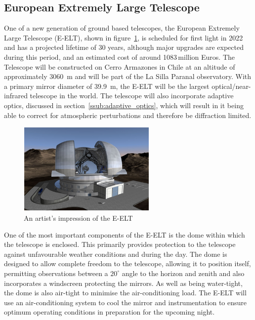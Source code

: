 
\subsection{European Extremely Large Telescope} %
\label{sub:european_extremely_large_telescope}
	One of a new generation of ground based telescopes, the European Extremely Large Telescope (E-ELT), shown in figure~\ref{fig:artist_eelt}, is scheduled for first light in 2022 and has a projected lifetime of 30 years, although major upgrades are expected during this period\cite[p.~163]{E_ELT_Construction_Proposal}, and an estimated cost of around 1083\,million Euros. The Telescope will be constructed on Cerro Armazones in Chile at an altitude of approximately \SI{3060}{\metre} and will be part of the La Silla Paranal observatory. With a primary mirror diameter of \SI{39.9}{\metre}, the E-ELT will be the largest optical/near-infrared telescope in the world. The telescope will also incorporate adaptive optics, discussed in section~\ref{ssub:adaptive_optics}, which will result in it being able to correct for atmospheric perturbations and therefore be diffraction limited.
	\begin{figure}[ht]
		\centering
		\includegraphics[width=0.6\textwidth]{../Images/E-ELT.png}
		\caption{An artist's impression of the E-ELT\cite{E_ELT_Enclosure}}\label{fig:artist_eelt}
	\end{figure}

	One of the most important components of the E-ELT is the dome within which the telescope is enclosed. This primarily provides protection to the telescope against unfavourable weather conditions and during the day. The dome is designed to allow complete freedom to the telescope, allowing it to position itself, permitting observations between a $20^{\circ}$ angle to the horizon and zenith and also incorporates a windscreen protecting the mirrors. As well as being water-tight, the dome is also air-tight to minimise the air-conditioning load. The E-ELT will use an air-conditioning system to cool the mirror and instrumentation to ensure optimum operating conditions in preparation for the upcoming night.

